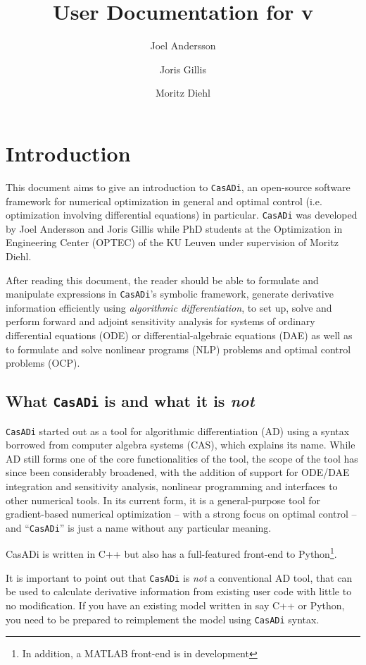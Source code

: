 \documentclass[a4paper,12pt]{book}
\author{Joel Andersson \and Joris Gillis \and Moritz Diehl}
\title{User Documentation for \CasADi v\currentversion}
\newcommand{\CasADi}{\texttt{CasADi}\xspace}
\begin{document}
\titlepage
\maketitle
\begin{latexonly}
\tableofcontents
\end{latexonly}
\clearpage

\chapter{Introduction}
This document aims to give an introduction to \CasADi, an open-source software framework for numerical optimization in general and optimal control (i.e. optimization involving differential equations) in particular. \CasADi was developed by Joel Andersson and Joris Gillis while PhD students at the Optimization in Engineering Center (OPTEC) of the KU Leuven under supervision of Moritz Diehl.

After reading this document, the reader should be able to formulate and manipulate expressions in \CasADi's symbolic framework, generate derivative information efficiently using \emph{algorithmic differentiation}, to set up, solve and perform forward and adjoint sensitivity analysis for systems of ordinary differential equations (ODE) or differential-algebraic equations (DAE) as well as to formulate and solve nonlinear programs (NLP) problems and optimal control problems (OCP).

\section{What \CasADi is and what it is \emph{not}}
\CasADi started out as a tool for algorithmic differentiation (AD) using a syntax borrowed from computer algebra systems (CAS), which explains its name. While AD still forms one of the core functionalities of the tool, the scope of the tool has since been considerably broadened, with the addition of support for ODE/DAE integration and sensitivity analysis, nonlinear programming and interfaces to other numerical tools. In its current form, it is a general-purpose tool for gradient-based numerical optimization -- with a strong focus on optimal control -- and ``\CasADi'' is just a name without any particular meaning.

CasADi is written in C++ but also has a full-featured front-end to Python\footnote{In addition, a MATLAB front-end is in development}.

It is important to point out that \CasADi is \emph{not} a conventional AD tool, that can be used to calculate derivative information from existing user code with little to no modification. If you have an existing model written in say C++ or Python, you need to be prepared to reimplement the model using \CasADi syntax.
\end{document}
